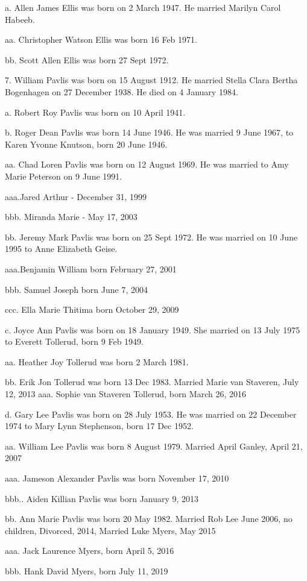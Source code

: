 \documentclass[a4paper]{article}
\begin{document}
a. Allen James Ellis was born on 2 March 1947.  He married Marilyn Carol Habeeb.

aa. Christopher Watson Ellis was born 16 Feb 1971.

bb. Scott Allen Ellis was born 27 Sept 1972.

7. William Pavlis was born on 15 August 1912.  He married Stella Clara Bertha Bogenhagen on 27 December 1938.  He died on 4 January 1984.

a. Robert Roy Pavlis was born on 10 April 1941. 

b. Roger Dean Pavlis was born 14 June 1946.  He was married 9 June 1967, to Karen Yvonne Knutson, born 20 June 1946.

aa.  Chad Loren Pavlis was born on 12 August 1969.  He was married to Amy Marie Peterson on 9 June 1991.

aaa.Jared Arthur - December 31, 1999

bbb. Miranda Marie - May 17, 2003

bb. Jeremy Mark Pavlis was born on 25 Sept 1972.  He was married on 10 June 1995 to Anne Elizabeth Geise.

aaa.Benjamin William  born February 27, 2001

bbb. Samuel Joseph born June 7, 2004

ccc. Ella Marie Thitima  born October 29, 2009

c. Joyce Ann Pavlis was born on 18 January 1949.  She married on 13 July 1975 to Everett Tollerud, born 9 Feb 1949.  

aa. Heather Joy Tollerud was born 2 March 1981.

bb. Erik Jon Tollerud was born 13 Dec 1983.   Married Marie van Staveren, July 12, 2013
aaa.  Sophie van Staveren Tollerud, born March 26, 2016

d. Gary Lee Pavlis was born on 28 July 1953.  He was married on 22 December 1974 to Mary Lynn Stephenson, born 17 Dec 1952.

aa. William Lee Pavlis was born 8 August 1979.  Married April Ganley, April 21, 2007

aaa. Jameson Alexander Pavlis was born November 17, 2010

bbb..  Aiden Killian Pavlis was born January 9, 2013

bb. Ann Marie Pavlis was born 20 May 1982.  Married Rob Lee June 2006, no children, Divorced, 2014, Married Luke Myers, May 2015

aaa.  Jack Laurence Myers, born April 5, 2016

bbb.  Hank David Myers, born July 11, 2019
\end{document}
